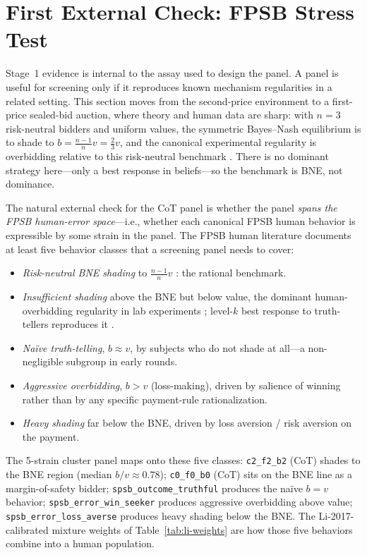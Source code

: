 \documentclass[12pt]{article}
\begin{document}
\section{First External Check: FPSB Stress Test}
\label{sec:external}

Stage~1 evidence is internal to the assay used to design the panel. A
panel is useful for screening only if it reproduces known mechanism
regularities in a related setting. This section moves from the
second-price environment to a first-price sealed-bid auction, where
theory and human data are sharp: with $n=3$ risk-neutral bidders and
uniform values, the symmetric Bayes--Nash equilibrium is to shade to
$b=\tfrac{n-1}{n}v=\tfrac{2}{3}v$, and the canonical experimental
regularity is overbidding relative to this risk-neutral benchmark
\citep{kagellevin1993}. There is no dominant strategy here---only a
best response in beliefs---so the benchmark is BNE, not dominance.

The natural external check for the CoT panel is whether the
panel \emph{spans the FPSB human-error space}---i.e., whether each
canonical FPSB human behavior is expressible by some strain in the
panel. The FPSB human literature documents at least five behavior
classes that a screening panel needs to cover:
\begin{itemize}
\item \textit{Risk-neutral BNE shading} to $\tfrac{n-1}{n}v$
\citep{kagellevin1993}: the rational benchmark.
\item \textit{Insufficient shading} above the BNE but below value,
the dominant human-overbidding regularity in lab experiments
\citep{kagellevin1993}; level-$k$ best response to
truth-tellers reproduces it \citep{crawfordiriberri2007}.
\item \textit{Naïve truth-telling}, $b\approx v$, by subjects who do
not shade at all---a non-negligible subgroup in early rounds.
\item \textit{Aggressive overbidding}, $b > v$ (loss-making), driven
by salience of winning rather than by any specific
payment-rule rationalization.
\item \textit{Heavy shading} far below the BNE, driven by loss
aversion / risk aversion on the payment.
\end{itemize}
The 5-strain cluster panel maps onto these five classes:
\texttt{c2\_f2\_b2} (CoT) shades to the BNE region (median $b/v
\approx 0.78$); \texttt{c0\_f0\_b0} (CoT) sits on the BNE line as a
margin-of-safety bidder; \texttt{spsb\_outcome\_truthful} produces
the naïve $b=v$ behavior; \texttt{spsb\_error\_win\_seeker} produces
aggressive overbidding above value; \texttt{spsb\_error\_loss\_averse}
produces heavy shading below the BNE. The Li-2017-calibrated mixture
weights of Table~\ref{tab:li-weights} are how those five behaviors
combine into a human population.
\end{document}
